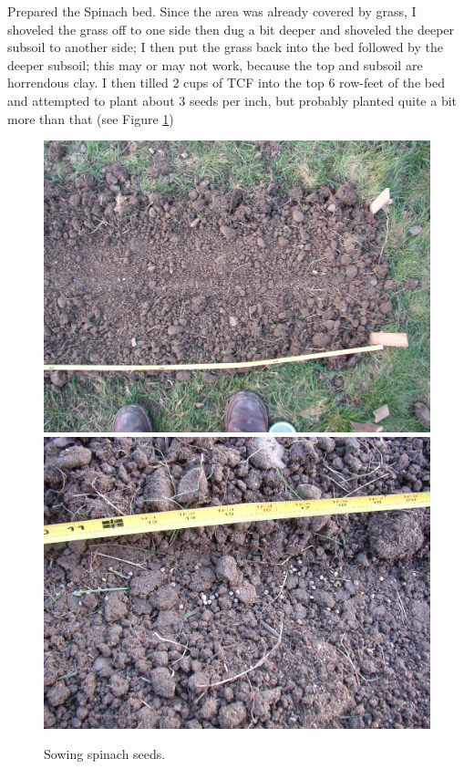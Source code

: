 \documentclass{article}
\begin{document}
Prepared the Spinach bed. Since the area was already covered by grass, I shoveled the grass off to one side then dug a bit deeper and shoveled the deeper subsoil to another side; I then put the grass back into the bed followed by the deeper subsoil; this may or may not work, because the top and subsoil are horrendous clay. I then tilled 2 cups of TCF into the top 6 row-feet of the bed and attempted to plant about 3 seeds per inch, but probably planted quite a bit more than that (see Figure \ref{0317sowingspinach}) \\
\begin{figure}
\protect \includegraphics[scale=0.20]{pics/0317_spinach1.jpg}
\protect \includegraphics[scale=0.20]{pics/0317_spinach2.jpg}
\caption{Sowing spinach seeds.}
\label{0317sowingspinach}
\end{figure}
\end{document}
